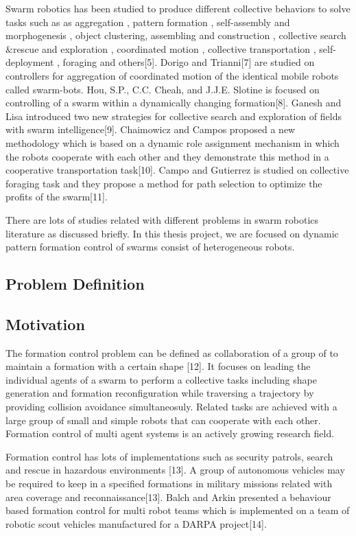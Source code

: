 \documentclass[twoside]{article}
\begin{document}
Swarm robotics has been studied to produce different collective behaviors to solve tasks such as as aggregation , pattern formation , self-assembly and morphogenesis , object clustering, assembling and construction , collective search$\&$rescue and exploration , coordinated motion , collective transportation , self-deployment , foraging and others[5]. Dorigo and Trianni[7] are studied on controllers for aggregation of coordinated motion of the identical mobile robots called swarm-bots.  Hou, S.P., C.C. Cheah, and J.J.E. Slotine is focused on controlling of a swarm within a dynamically changing formation[8]. Ganesh and Lisa introduced two new strategies for collective search and exploration of fields with swarm intelligence[9]. Chaimowicz and Campos proposed a new methodology which is based on a dynamic role assignment mechanism in which the robots cooperate with each other and they demonstrate this method in a cooperative transportation task[10].  Campo and Gutierrez is studied on collective foraging task and they propose a method for path selection to optimize the profits of the swarm[11].

There are lots of studies related with different problems in swarm robotics literature as discussed briefly. In this thesis project, we are focused on dynamic pattern formation control of swarms consist of heterogeneous robots.


\subsection{Problem Definition}


\subsection{Motivation}


The formation control problem can be defined as collaboration of a group of to maintain a formation with a certain shape [12]. It focuses on leading the individual agents of a swarm to perform a collective tasks including shape generation and formation reconfiguration while traversing a trajectory by providing collision avoidance simultaneosuly. Related tasks are achieved with a large group of small and simple robots  that can cooperate with each other. Formation control of multi agent systems  is an actively growing research field.  

Formation control has lots of implementations such as security patrols, search and rescue in hazardous environments [13]. A group of autonomous vehicles may be required to keep in a specified formations in military missions related with area coverage and reconnaissance[13].  Balch and Arkin presented a behaviour based formation control for multi robot teams which is implemented on a team of robotic scout vehicles manufactured for a DARPA project[14]. 
\end{document}
